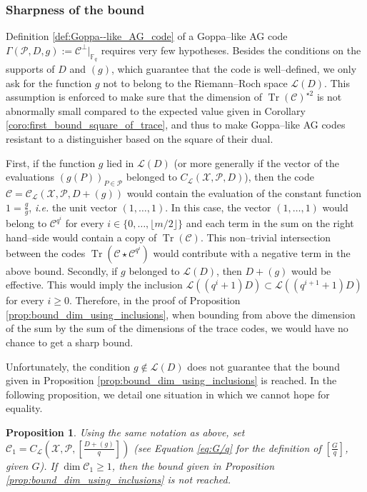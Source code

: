 \documentclass[a4paper]{amsart}
\newtheorem{proposition}[thm]{Proposition}
\theoremstyle{definition}
\theoremstyle{remark}
\DeclareMathOperator{\trace}{Tr}
\newcommand{\calP}{\mathcal{P}}
\newcommand{\calL}{\mathcal{L}}
\newcommand{\calC}{\mathcal{C}}
\newcommand{\calX}{\mathcal{X}}
\newcommand{\fq}{\mathbb{F}_{q}}
\newcommand{\Tr}[1]{\trace\!\left(#1\right)}
\begin{document}
\subsubsection{Sharpness of the bound} \label{section:sharpness}

Definition \ref{def:Goppa--like_AG_code} of a Goppa--like AG code $\Gamma(\calP,D,g) := \calC^{\perp}|_{\fq}$ requires very few hypotheses. Besides the conditions on the supports of $D$ and $(g)$, which guarantee that the code is well--defined, we only ask for the function $g$ not to belong to the Riemann--Roch space $\calL(D)$. This assumption is enforced to make sure that the dimension of $\Tr{\calC}^{\star 2}$ is not abnormally small compared to the expected value given in Corollary \ref{coro:first_bound_square_of_trace}, and thus to make Goppa--like AG codes resistant to a distinguisher based on the square of their dual.

First, if the function $g$ lied in $\calL(D)$ (or more generally if the vector of the evaluations $(g(P))_{P \in \calP}$ belonged to $C_\calL(\calX,\calP,D)$), then the code $\calC= \calC_{\calL}(\calX,\calP,D+(g))$ would contain the evaluation of the constant function $1=\frac{g}{g}$, \textit{i.e.} the unit vector $(1,\dots,1)$. In this case, the vector $(1,\dots,1)$ would belong to $\calC^{q^i}$ for every $i \in \{0,\dots, \lfloor{m/2} \rfloor\}$ and each term in the sum on the right hand--side would contain a copy of $\Tr{\calC}$. This non--trivial intersection between the codes $\Tr{\calC\star \calC^{q^i}}$ would contribute with a negative term in the above bound.
Secondly, if $g$ belonged to $\calL(D)$, then $D+(g)$ would be effective. This would imply the inclusion $\calL((q^i+1)D) \subset \calL((q^{i+1}+1)D)$ for every $i \geq 0$. Therefore, in the proof of Proposition \ref{prop:bound_dim_using_inclusions}, when bounding from above the dimension of the sum by the sum of the dimensions of the trace codes, we would have no chance to get a sharp bound.

Unfortunately, the condition $g \notin \calL(D)$ does not guarantee that the bound given in Proposition \ref{prop:bound_dim_using_inclusions} is reached. In the following proposition, we detail one situation in which we cannot hope for equality.

\begin{proposition}\label{prop:non-eq}
	Using the same notation as above, set $\calC_1=C_{\calL}\left(\calX,\mathcal{P},\left[ \frac{D+(g)}{q} \right]\right)$ (see Equation \eqref{eq:G/q} for the definition of $\left[ \frac{G}{q} \right]$, given $G$). If $\dim \calC_1 \geq 1$, then the bound given in Proposition \ref{prop:bound_dim_using_inclusions} is not reached.
\end{proposition}
\end{document}
